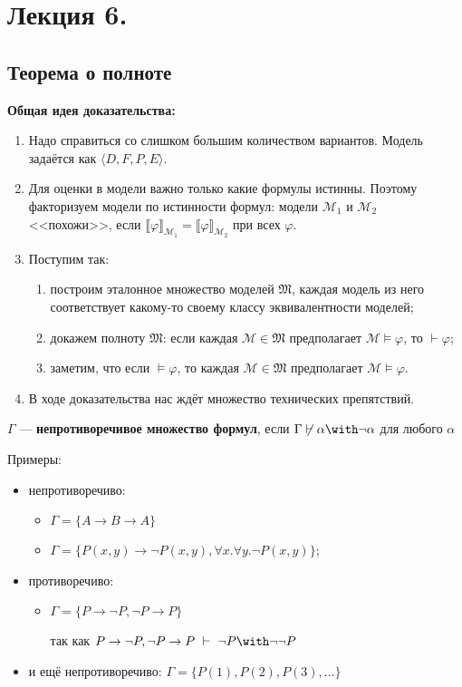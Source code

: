 \section{Лекция 6.}

\subsection{Теорема о полноте}

\textbf{Общая идея доказательства:}

\begin{enumerate}
\item Надо справиться со слишком большим количеством вариантов.
      Модель задаётся как $\langle D,F,P,E \rangle$.
\item Для оценки в модели важно только какие формулы истинны. Поэтому факторизуем модели по истинности формул:
      модели $\mathcal{M}_1$ и $\mathcal{M}_2$ <<похожи>>, если
      $\llbracket \varphi \rrbracket_{\mathcal{M}_1} = \llbracket \varphi \rrbracket_{\mathcal{M}_2}$
      при всех $\varphi$.
\item Поступим так:
    \begin{enumerate}
       \item построим эталонное множество моделей $\mathfrak{M}$, каждая модель из него соответствует какому-то своему классу эквивалентности моделей;
       \item докажем полноту $\mathfrak{M}$: если каждая $\mathcal{M} \in \mathfrak{M}$ предполагает $\mathcal{M}\models\varphi$,
             то $\vdash\varphi$;
       \item заметим, что если $\models\varphi$, то каждая $\mathcal{M} \in \mathfrak{M}$ предполагает $\mathcal{M}\models\varphi$.
    \end{enumerate}
\item В ходе доказательства нас ждёт множество технических препятствий.
\end{enumerate}


 $\Gamma$ --- \textbf{непротиворечивое множество формул},
если $\Gamma\not\vdash\alpha\with\neg\alpha$ для любого $\alpha$

Примеры:
\begin{itemize}
\item непротиворечиво: 
\begin{itemize}
\item $\Gamma = \{A \rightarrow B \rightarrow A\}$
\item $\Gamma = \{P(x,y)\rightarrow\neg P(x,y), \forall x.\forall y.\neg P(x,y)\}$;
\end{itemize}
\item противоречиво: 
\begin{itemize}
\item $\Gamma = \{P\rightarrow\neg P, \neg P \rightarrow P\}$

так как
$P\rightarrow\neg P, \neg P \rightarrow P \ \vdash\  \neg P \with \neg\neg P$
\end{itemize}
\item и ещё непротиворечиво: $\Gamma = \{P(1), P(2), P(3), \dots\}$
\end{itemize}



